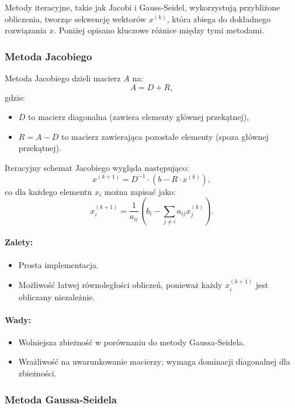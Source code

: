 \documentclass[a4paper,12pt]{article}
\begin{document}
Metody iteracyjne, takie jak Jacobi i Gauss-Seidel, wykorzystują przybliżone obliczenia, tworząc sekwencję wektorów \(x^{(k)}\), która zbiega do dokładnego rozwiązania \(x\). Poniżej opisano kluczowe różnice między tymi metodami.

\subsubsection{Metoda Jacobiego}

Metoda Jacobiego dzieli macierz \(A\) na:
\[
A = D + R,
\]
gdzie:
\begin{itemize}
    \item \(D\) to macierz diagonalna (zawiera elementy głównej przekątnej),
    \item \(R = A - D\) to macierz zawierająca pozostałe elementy (spoza głównej przekątnej).
\end{itemize}

Iteracyjny schemat Jacobiego wygląda następująco:
\[
x^{(k+1)} = D^{-1} \cdot (b - R \cdot x^{(k)}),
\]
co dla każdego elementu \(x_i\) można zapisać jako:
\[
x_i^{(k+1)} = \frac{1}{a_{ii}} \left( b_i - \sum_{j \neq i} a_{ij} x_j^{(k)} \right).
\]

\paragraph{Zalety:}
\begin{itemize}
    \item Prosta implementacja.
    \item Możliwość łatwej równoległości obliczeń, ponieważ każdy \(x_i^{(k+1)}\) jest obliczany niezależnie.
\end{itemize}

\paragraph{Wady:}
\begin{itemize}
    \item Wolniejsza zbieżność w porównaniu do metody Gaussa-Seidela.
    \item Wrażliwość na uwarunkowanie macierzy; wymaga dominacji diagonalnej dla zbieżności.
\end{itemize}

\subsubsection{Metoda Gaussa-Seidela}
\end{document}
